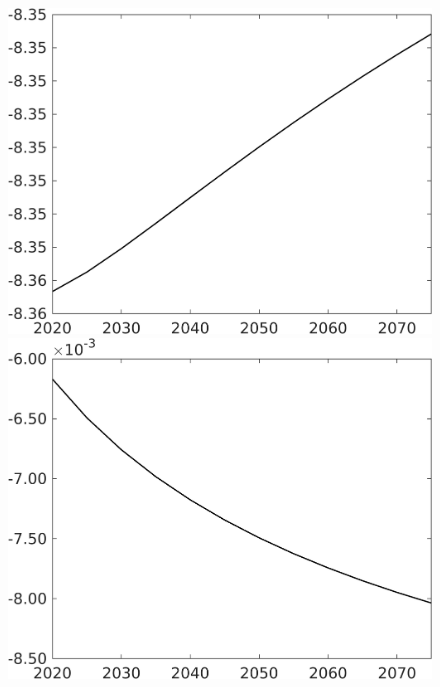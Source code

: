 \documentclass[12pt]{article}
\begin{document}
\begin{figure}[h!!]
\begin{minipage}[]{0.32\textwidth}
	\end{minipage}	
	\begin{minipage}[]{0.32\textwidth}
		\includegraphics[width=1\textwidth]{../../codding_model/own_basedOnFried/optimalPol_010922_revision/figures/all_13Sept22/CompTaul_Equlab_LFBAUPer_Reg0_N_spillover0_nsk0_xgr1_knspil0_sep1_countec0_GovRev0_etaa0.79.png}
	\end{minipage}	
	\begin{minipage}[]{0.32\textwidth}
		\includegraphics[width=1\textwidth]{../../codding_model/own_basedOnFried/optimalPol_010922_revision/figures/all_13Sept22/CompTaul_Equlab_LFBAUPer_Reg0_EY_spillover0_nsk0_xgr1_knspil0_sep1_countec0_GovRev0_etaa0.79.png}

\end{minipage}
\end{figure}
\end{document}
